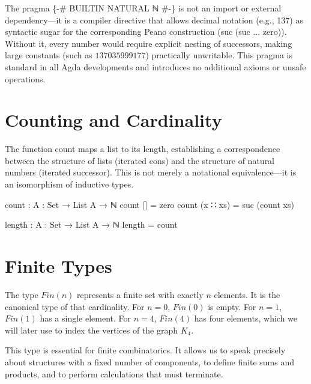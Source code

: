 \documentclass[11pt,a4paper]{book}
\def\mathrm#1{#1}%
\def\texttt#1{#1}%
\begin{document}
The pragma \texttt{\{-\# BUILTIN NATURAL ℕ \#-\}} is not an import or external dependency—it 
is a compiler directive that allows decimal notation (e.g., \texttt{137}) as syntactic sugar 
for the corresponding Peano construction (\texttt{suc (suc ... zero)}). Without it, every 
number would require explicit nesting of successors, making large constants (such as 
$137035999177$) practically unwritable. This pragma is standard in all Agda developments 
and introduces no additional axioms or unsafe operations.

\section{Counting and Cardinality}

The function \texttt{count} maps a list to its length, establishing a correspondence 
between the structure of lists (iterated cons) and the structure of natural numbers 
(iterated successor). This is not merely a notational equivalence—it is an isomorphism 
of inductive types.

\begin{code}
count : {A : Set} → List A → ℕ
count []       = zero
count (x ∷ xs) = suc (count xs)

length : {A : Set} → List A → ℕ
length = count
\end{code}

\section{Finite Types}

The type $\mathrm{Fin}(n)$ represents a finite set with exactly $n$ elements. It is 
the canonical type of that cardinality. For $n = 0$, $\mathrm{Fin}(0)$ is empty. For 
$n = 1$, $\mathrm{Fin}(1)$ has a single element. For $n = 4$, $\mathrm{Fin}(4)$ has 
four elements, which we will later use to index the vertices of the graph $K_4$.

This type is essential for finite combinatorics. It allows us to speak precisely 
about structures with a fixed number of components, to define finite sums and products, 
and to perform calculations that must terminate.
\end{document}

